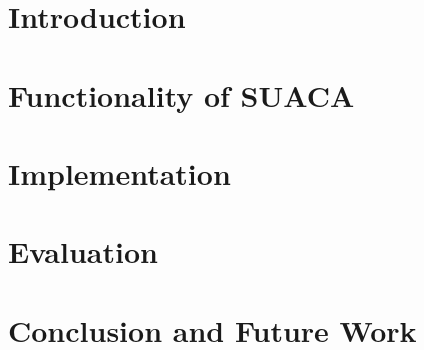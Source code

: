 \documentclass[a4paper,12pt,titlepage, twoside, openright]{report}
\begin{document}
\setlength{\oddsidemargin}{\dimexpr (\paperwidth-\textwidth)/2 - 1in\relax}
\setlength{\evensidemargin}{\oddsidemargin}



\setcounter{page}{0}
\tableofcontents 



\chapter{Introduction}






\chapter{Functionality of SUACA}
\label{chap:functionality}






\chapter{Implementation}
\label{chap:algorithms}





\chapter{Evaluation}
\label{chap:eval}





\chapter{Conclusion and Future Work}




\printbibliography
\end{document}
